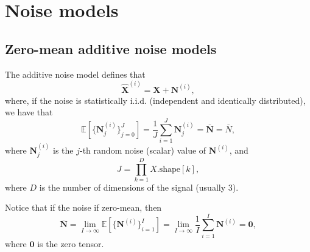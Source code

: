 \documentclass{article}
\begin{document}
\section{Noise models}
\label{sec:noise_models}

\subsection{Zero-mean additive noise models}
The additive noise model defines that
\begin{equation}
  \hat{\mathbf X}^{(i)} = {\mathbf X} + {\mathbf N}^{(i)},
  \label{eq:additive_noisy_model}
\end{equation}
where, if the noise is statistically i.i.d. (independent and
identically distributed), we have that
\begin{equation}
  {\mathbb E}[\{{\mathbf N}^{(i)}_j\}_{j=0}^J]=\frac{1}{J} \sum_{i=1}^J {\mathbf N}_j^{(i)}=\overline{\mathbf N}=\overline{N},
  \label{eq:noise_expectation_1}
\end{equation}
where ${\mathbf N}^{(i)}_j$ is the $j$-th random noise (scalar) value
of ${\mathbf N}^{(i)}$, and
\begin{equation}
  J=\prod_{k=1}^D X.\text{shape}[k],
\end{equation}
where $D$ is the number of dimensions of the signal (usually 3).

Notice that if the noise if zero-mean, then
\begin{equation}
  \overline{\mathbf N} = \lim_{I \to \infty}{\mathbb E}[\{{\mathbf N^{(i)}}\}_{i=1}^I]=\lim_{I \to \infty}\frac{1}{I} \sum_{i=1}^I {\mathbf N}^{(i)}={\mathbf 0},
  \label{eq:noise_expectation_2}
\end{equation}
where ${\mathbf 0}$ is the zero tensor.
\end{document}
